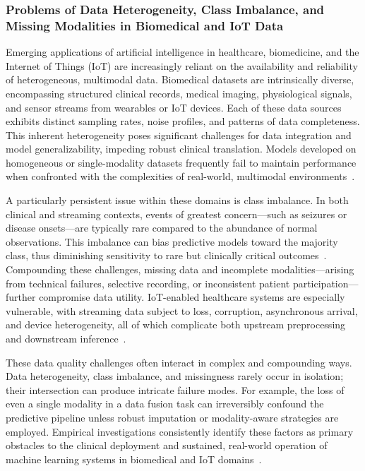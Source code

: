 \subsubsection{Problems of Data Heterogeneity, Class Imbalance, and Missing Modalities in Biomedical and IoT Data}

Emerging applications of artificial intelligence in healthcare, biomedicine, and the Internet of Things (IoT) are increasingly reliant on the availability and reliability of heterogeneous, multimodal data. Biomedical datasets are intrinsically diverse, encompassing structured clinical records, medical imaging, physiological signals, and sensor streams from wearables or IoT devices. Each of these data sources exhibits distinct sampling rates, noise profiles, and patterns of data completeness. This inherent heterogeneity poses significant challenges for data integration and model generalizability, impeding robust clinical translation. Models developed on homogeneous or single-modality datasets frequently fail to maintain performance when confronted with the complexities of real-world, multimodal environments~\cite{ref78,ref82,ref83}.

A particularly persistent issue within these domains is class imbalance. In both clinical and streaming contexts, events of greatest concern—such as seizures or disease onsets—are typically rare compared to the abundance of normal observations. This imbalance can bias predictive models toward the majority class, thus diminishing sensitivity to rare but clinically critical outcomes~\cite{ref83,ref84}. Compounding these challenges, missing data and incomplete modalities—arising from technical failures, selective recording, or inconsistent patient participation—further compromise data utility. IoT-enabled healthcare systems are especially vulnerable, with streaming data subject to loss, corruption, asynchronous arrival, and device heterogeneity, all of which complicate both upstream preprocessing and downstream inference~\cite{ref90,ref106}.

These data quality challenges often interact in complex and compounding ways. Data heterogeneity, class imbalance, and missingness rarely occur in isolation; their intersection can produce intricate failure modes. For example, the loss of even a single modality in a data fusion task can irreversibly confound the predictive pipeline unless robust imputation or modality-aware strategies are employed. Empirical investigations consistently identify these factors as primary obstacles to the clinical deployment and sustained, real-world operation of machine learning systems in biomedical and IoT domains~\cite{ref78,ref84,ref106}.

